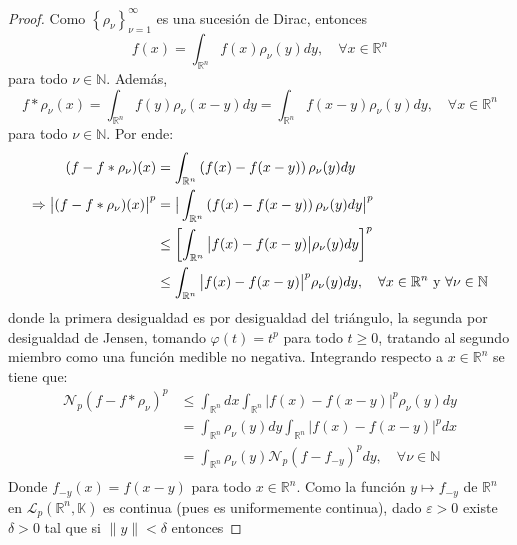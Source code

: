 \documentclass[12pt]{report}
\theoremstyle{largebreak}
\newcommand\abs[1]{\ensuremath{\big|#1\big|}}
\newcommand\norm[1]{\ensuremath{\|#1\|}}
\newcommand{\N}[2]{\ensuremath{\mathcal{N}_{#1}\left(#2\right)}}
\begin{document}
    \begin{proof}
        Como $\left\{\rho_\nu \right\}_{\nu=1}^\infty$ es una sucesión de Dirac, entonces
        \begin{equation*}
            f(x)=\int_{\mathbb{R}^n}f(x)\rho_\nu(y)dy,\quad\forall x\in\mathbb{R}^n
        \end{equation*}
        para todo $\nu\in\mathbb{N}$. Además,
        \begin{equation*}
            f*\rho_\nu(x)=\int_{\mathbb{R}^n}f(y)\rho_\nu(x-y)dy=\int_{\mathbb{R}^n}f(x-y)\rho_\nu(y)dy,\quad\forall x\in\mathbb{R}^n
        \end{equation*}
        para todo $\nu\in\mathbb{N}$. Por ende:
        \begin{equation*}
            \begin{split}
                (f-f*\rho_\nu)(x)&=\int_{\mathbb{R}^n}\left(f(x)-f(x-y)\right)\rho_\nu(y)dy\\
                \Rightarrow \abs{(f-f*\rho_\nu)(x)}^p&=\abs{\int_{\mathbb{R}^n}\left(f(x)-f(x-y)\right)\rho_\nu(y)dy}^p\\
                &\leq\left[\int_{\mathbb{R}^n}\abs{f(x)-f(x-y)}\rho_\nu(y)dy\right]^p \\
                &\leq\int_{\mathbb{R}^n}\abs{f(x)-f(x-y)}^p\rho_\nu(y)dy,\quad\forall x\in\mathbb{R}^n\textup{ y }\forall\nu\in\mathbb{N}\\
            \end{split}
        \end{equation*}
        donde la primera desigualdad es por desigualdad del triángulo, la segunda por desigualdad de Jensen, tomando $\varphi(t)=t^p$ para todo $t\geq 0$, tratando al segundo miembro como una función medible no negativa. Integrando respecto a $x\in\mathbb{R}^n$ se tiene que:
        \begin{equation*}
            \begin{split}
                \N{p}{f-f*\rho_\nu}^p&\leq\int_{\mathbb{R}^n}dx\int_{\mathbb{R}^n}\abs{f(x)-f(x-y)}^p\rho_\nu(y)dy\\
                &=\int_{\mathbb{R}^n}\rho_\nu(y)dy\int_{\mathbb{R}^n}\abs{f(x)-f(x-y)}^pdx\\
                &=\int_{\mathbb{R}^n}\rho_\nu(y)\N{p}{f-f_{-y}}^pdy,\quad\forall\nu\in\mathbb{N}\\
            \end{split}
        \end{equation*}
        Donde $f_{-y}(x)=f(x-y)$ para todo $x\in\mathbb{R}^n$. Como la función $y\mapsto f_{-y}$ de $\mathbb{R}^n$ en $\mathcal{L}_p(\mathbb{R}^n,\mathbb{K})$ es continua (pues es uniformemente continua), dado $\varepsilon>0$ existe $\delta>0$ tal que si $\norm{y}<\delta$ entonces

\end{proof}
\end{document}
